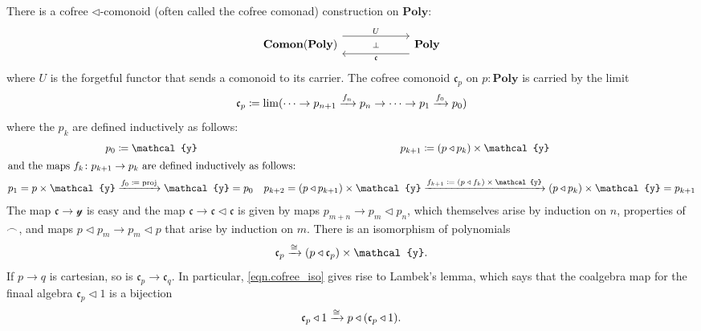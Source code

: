 \documentclass[11pt, one side, article]{memoir}
\theoremstyle{definition}
\theoremstyle{plain}
\newcommand{\Cat}[1]{\mathbf{#1}}%
\newcommand{\To}[2][]{\xrightarrow[#1]{\tn{$#2$}}}
\newcommand{\tn}[1]{\textnormal{#1}}
\newcommand{\nn}{\mathbb{N}}
\newcommand{\smset}{\Cat{Set}}
\newcommand{\yon}{{\mathcal{y}}}
\newcommand{\poly}{\Cat{Poly}}
\newcommand{\0}{\textsf{0}}
\newcommand{\1}{\tn{\textsf{1}}}
\newcommand{\tri}{\mathbin{\triangleleft}}
\newcommand{\cofree}{\mathfrak{c}}
\newcommand{\indexcoclscale}[1]{\scalebox{.7}{#1}}
\newcommand{\cocl}[1]{
	\scriptsize\overset{\,\indexcoclscale{$#1$}}{\frown}\normalsize
}
\begin{document}
There is a cofree $\tri$-comonoid (often called the cofree comonad) construction on $\poly$:
\begin{equation}\label{eqn.cofree}
\begin{tikzcd}[column sep=60pt]
	\Cat{Comon}(\poly)
  	\ar[from=r, shift left=8pt, "\cofree"]
		\ar[from=r, phantom, "\scriptstyle\bot"]
  	&
	\poly
		\ar[from=l, shift right=-8pt, "U"]
\end{tikzcd}
\end{equation}
where $U$ is the forgetful functor that sends a comonoid to its carrier. The cofree comonoid $\cofree_p$ on $p:\poly$ is carried by the limit
\begin{equation}
\cofree_p\coloneqq\lim(\cdots\to p_{n+1}\To{f_n} p_n\to\cdots\to p_1\To{f_0} p_0)
\end{equation}
where the $p_k$ are defined inductively as follows:
\begin{align}
	p_0&\coloneqq\yon&p_{k+1}&\coloneqq (p\tri p_k)\times\yon\\
\intertext{and the maps $f_k\colon p_{k+1}\to p_k$ are defined inductively as follows:}
	p_1=p\times\yon&\To{f_0\coloneqq\tn{proj}}\yon=p_0&p_{k+2}=(p\tri p_{k+1})\times\yon&\To{f_{k+1}\coloneqq(p\tri f_k)\times\yon}(p\tri p_{k})\times\yon=p_{k+1}
\end{align}
The map $\cofree\to\yon$ is easy and the map $\cofree\to\cofree\tri\cofree$ is given by maps $p_{m+n}\to p_m\tri p_n$, which themselves arise by induction on $n$, properties of $\cocl{}$, and maps $p\tri p_m\to p_m\tri p$ that  arise by induction on $m$. There is an isomorphism of polynomials
\begin{equation}\label{eqn.cofree_iso}
	\cofree_p\To{\cong} (p\tri\cofree_p)\times\yon.
\end{equation}
If $p\to q$ is cartesian, so is $\cofree_p\to\cofree_q$. In particular, \eqref{eqn.cofree_iso} gives rise to Lambek's lemma, which says that the coalgebra map for the finaal algebra $\cofree_p\tri 1$ is a bijection
\begin{equation}
		\cofree_p\tri 1\To\cong p\tri(\cofree_p\tri 1).
\end{equation}
 
\end{document}
